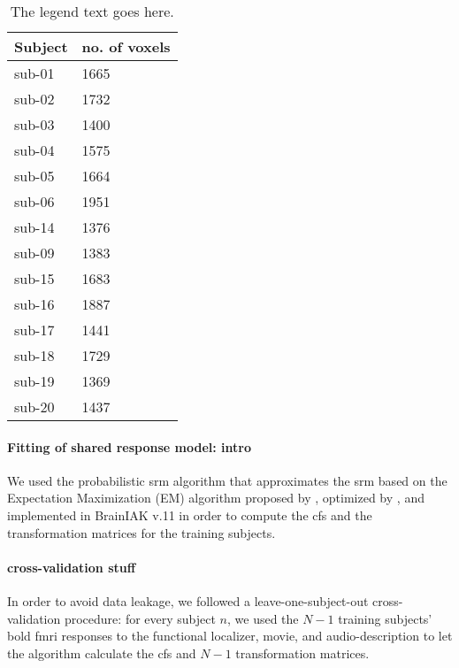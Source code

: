 

\begin{table*}[btp]
    \caption{
    \textbf{Table heading.}
    Number of remaining voxels after time series data of each paradigm
    and subject were masked with the union of individual \acp{ppa} that was
    warped from MNI space into each individual's subjects-space and the
    subject-specific field of view of audio-description.}

\label{tab:ppamaskvoxels}
\begin{tabular}{ll}
    \toprule
    \textbf{Subject} & \textbf{no. of voxels} \\
    \midrule
    sub-01 & 1665 \tabularnewline
    sub-02 & 1732 \tabularnewline
    sub-03 & 1400 \tabularnewline
    sub-04 & 1575 \tabularnewline
    sub-05 & 1664 \tabularnewline
    sub-06 & 1951 \tabularnewline
    sub-14 & 1376 \tabularnewline
    sub-09 & 1383 \tabularnewline
    sub-15 & 1683 \tabularnewline
    sub-16 & 1887 \tabularnewline
    sub-17 & 1441 \tabularnewline
    sub-18 & 1729 \tabularnewline
    sub-19 & 1369 \tabularnewline
    sub-20 & 1437 \tabularnewline
    \bottomrule
\end{tabular}
\caption*{The legend text goes here.}
\end{table*}


\paragraph{Fitting of shared response model: intro}


We used the probabilistic \ac{srm} algorithm that approximates the \ac{srm}
based on the Expectation Maximization (EM) algorithm proposed by
\citep{chen2015reduced}, optimized by \citet{anderson2016enabling}, and
implemented in BrainIAK v.11 \citep[Brain Imaging Analysis
Kit;][]{kumar2020brainiak, kumar2020brainiaktutorial} in order to compute the
\ac{cfs} and the transformation matrices for the training subjects.


\paragraph{cross-validation stuff}
%
In order to avoid data leakage, we followed a leave-one-subject-out
cross-validation procedure:
%
for every subject $n$, we used the $N-1$ training subjects' \ac{bold} \ac{fmri}
responses to the functional localizer, movie, and audio-description to let the
algorithm calculate the \ac{cfs} and $N-1$ transformation matrices.



